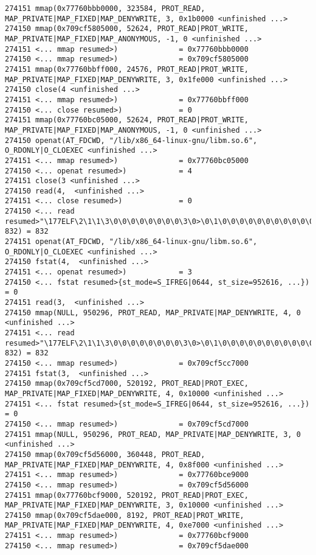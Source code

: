\begin{verbatim}
274151 mmap(0x77760bbb0000, 323584, PROT_READ, MAP_PRIVATE|MAP_FIXED|MAP_DENYWRITE, 3, 0x1b0000 <unfinished ...>
274150 mmap(0x709cf5805000, 52624, PROT_READ|PROT_WRITE, MAP_PRIVATE|MAP_FIXED|MAP_ANONYMOUS, -1, 0 <unfinished ...>
274151 <... mmap resumed>)              = 0x77760bbb0000
274150 <... mmap resumed>)              = 0x709cf5805000
274151 mmap(0x77760bbff000, 24576, PROT_READ|PROT_WRITE, MAP_PRIVATE|MAP_FIXED|MAP_DENYWRITE, 3, 0x1fe000 <unfinished ...>
274150 close(4 <unfinished ...>
274151 <... mmap resumed>)              = 0x77760bbff000
274150 <... close resumed>)             = 0
274151 mmap(0x77760bc05000, 52624, PROT_READ|PROT_WRITE, MAP_PRIVATE|MAP_FIXED|MAP_ANONYMOUS, -1, 0 <unfinished ...>
274150 openat(AT_FDCWD, "/lib/x86_64-linux-gnu/libm.so.6", O_RDONLY|O_CLOEXEC <unfinished ...>
274151 <... mmap resumed>)              = 0x77760bc05000
274150 <... openat resumed>)            = 4
274151 close(3 <unfinished ...>
274150 read(4,  <unfinished ...>
274151 <... close resumed>)             = 0
274150 <... read resumed>"\177ELF\2\1\1\3\0\0\0\0\0\0\0\0\3\0>\0\1\0\0\0\0\0\0\0\0\0\0\0"..., 832) = 832
274151 openat(AT_FDCWD, "/lib/x86_64-linux-gnu/libm.so.6", O_RDONLY|O_CLOEXEC <unfinished ...>
274150 fstat(4,  <unfinished ...>
274151 <... openat resumed>)            = 3
274150 <... fstat resumed>{st_mode=S_IFREG|0644, st_size=952616, ...}) = 0
274151 read(3,  <unfinished ...>
274150 mmap(NULL, 950296, PROT_READ, MAP_PRIVATE|MAP_DENYWRITE, 4, 0 <unfinished ...>
274151 <... read resumed>"\177ELF\2\1\1\3\0\0\0\0\0\0\0\0\3\0>\0\1\0\0\0\0\0\0\0\0\0\0\0"..., 832) = 832
274150 <... mmap resumed>)              = 0x709cf5cc7000
274151 fstat(3,  <unfinished ...>
274150 mmap(0x709cf5cd7000, 520192, PROT_READ|PROT_EXEC, MAP_PRIVATE|MAP_FIXED|MAP_DENYWRITE, 4, 0x10000 <unfinished ...>
274151 <... fstat resumed>{st_mode=S_IFREG|0644, st_size=952616, ...}) = 0
274150 <... mmap resumed>)              = 0x709cf5cd7000
274151 mmap(NULL, 950296, PROT_READ, MAP_PRIVATE|MAP_DENYWRITE, 3, 0 <unfinished ...>
274150 mmap(0x709cf5d56000, 360448, PROT_READ, MAP_PRIVATE|MAP_FIXED|MAP_DENYWRITE, 4, 0x8f000 <unfinished ...>
274151 <... mmap resumed>)              = 0x77760bce9000
274150 <... mmap resumed>)              = 0x709cf5d56000
274151 mmap(0x77760bcf9000, 520192, PROT_READ|PROT_EXEC, MAP_PRIVATE|MAP_FIXED|MAP_DENYWRITE, 3, 0x10000 <unfinished ...>
274150 mmap(0x709cf5dae000, 8192, PROT_READ|PROT_WRITE, MAP_PRIVATE|MAP_FIXED|MAP_DENYWRITE, 4, 0xe7000 <unfinished ...>
274151 <... mmap resumed>)              = 0x77760bcf9000
274150 <... mmap resumed>)              = 0x709cf5dae000

\end{verbatim}
